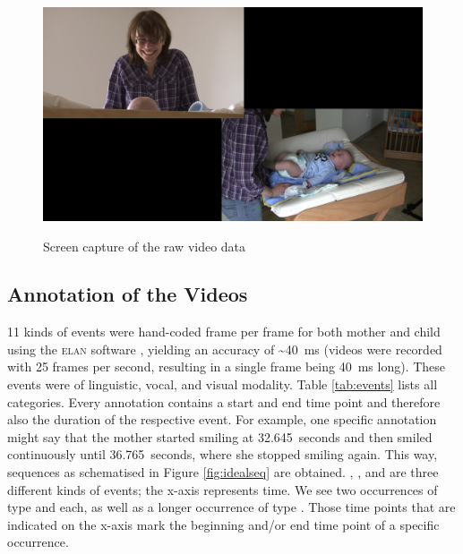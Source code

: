 \begin{figure}[h]
	\centering
	\includegraphics[width=\imgwidth]{../aux/img/video_vp_08_raw.png}
	\label{fig:rawvid}
	\caption{Screen capture of the raw video data}
\end{figure}

\subsection{Annotation of the Videos}
\label{ssec:miningmethodannotation}
11 kinds of events were hand-coded frame per frame for both mother and child using the \textsc{elan} software \citep{wittenburg06}, yielding an accuracy of \textasciitilde40~ms (videos were recorded with 25 frames per second, resulting in a single frame being 40~ms long). These events were of linguistic, vocal, and visual modality. %
Table \ref{tab:events} lists all categories. Every annotation contains a start and end time point and therefore also the duration of the respective event. For example, one specific annotation might say that the mother started smiling at 32.645~seconds and then smiled continuously until 36.765~seconds, where she stopped smiling again. This way, sequences as schematised in Figure \ref{fig:idealseq} are obtained. , , and  are three different kinds of events; the x-axis represents time. We see two occurrences of type  and  each, as well as a longer occurrence of type . Those time points that are indicated on the x-axis mark the beginning and/or end time point of a specific occurrence.

